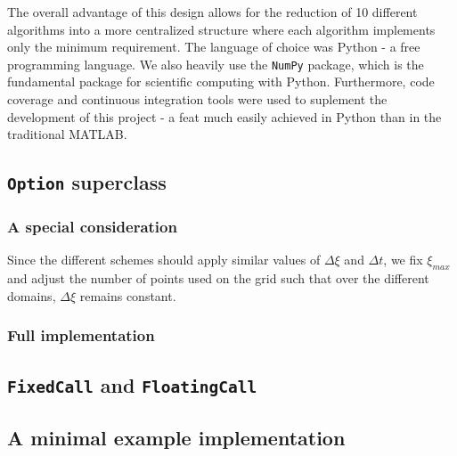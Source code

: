 \documentclass{article}
\begin{document}
The overall advantage of this design allows for the reduction of 10 different algorithms into a more centralized structure where each algorithm implements only the minimum requirement. The language of choice was Python - a free programming language. We also heavily use the \texttt{NumPy} package, which is the fundamental package for scientific computing with Python. Furthermore, code coverage and continuous integration tools were used to suplement the development of this project - a feat much easily achieved in Python than in the traditional MATLAB.

\subsection{\texttt{Option} superclass}

\subsubsection{A special consideration}
Since the different schemes should apply similar values of \(\Delta\xi\) and \(\Delta t\), we fix \(\xi_{max}\) and adjust the number of points used on the grid such that over the different domains, \(\Delta\xi\) remains constant.

\subsubsection{Full implementation}
\scriptsize

\normalsize

\subsection{\texttt{FixedCall} and \texttt{FloatingCall}}

\scriptsize

\normalsize

\scriptsize

\normalsize

\subsection{A minimal example implementation}
\end{document}
